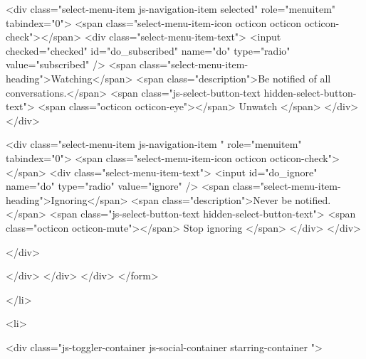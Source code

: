               <div class="select-menu-item js-navigation-item selected" role="menuitem" tabindex="0">
                <span class="select-menu-item-icon octicon octicon octicon-check"></span>
                <div class="select-menu-item-text">
                  <input checked="checked" id="do_subscribed" name="do" type="radio" value="subscribed" />
                  <span class="select-menu-item-heading">Watching</span>
                  <span class="description">Be notified of all conversations.</span>
                  <span class="js-select-button-text hidden-select-button-text">
                    <span class="octicon octicon-eye"></span>
                    Unwatch
                  </span>
                </div>
              </div>

              <div class="select-menu-item js-navigation-item " role="menuitem" tabindex="0">
                <span class="select-menu-item-icon octicon octicon-check"></span>
                <div class="select-menu-item-text">
                  <input id="do_ignore" name="do" type="radio" value="ignore" />
                  <span class="select-menu-item-heading">Ignoring</span>
                  <span class="description">Never be notified.</span>
                  <span class="js-select-button-text hidden-select-button-text">
                    <span class="octicon octicon-mute"></span>
                    Stop ignoring
                  </span>
                </div>
              </div>

            </div>

          </div>
        </div>
      </div>
</form>

  </li>

  <li>
    
  <div class="js-toggler-container js-social-container starring-container ">

